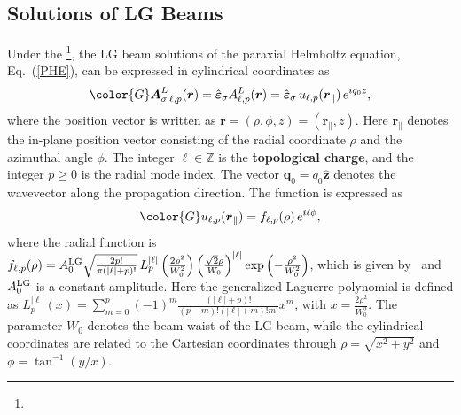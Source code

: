 \subsection{Solutions of LG Beams}
Under the \footnote{}, the LG beam solutions of the paraxial Helmholtz equation, Eq.~(\ref{PHE}), can be expressed in cylindrical coordinates as
\begin{equation}
\color{G}
\boldsymbol{A}^{L}_{\sigma, \ell, p}(\boldsymbol{r})
=
\hat{\boldsymbol{\varepsilon}}_\sigma  A^{L}_{\ell, p}(\boldsymbol{r})
=
\hat{\boldsymbol{\varepsilon}}_\sigma 
\, u_{\ell, p}(\boldsymbol{r}_\parallel)
\, e^{i q_0 z},
\label{LGbeam}
\end{equation}
where the position vector is written as $\boldsymbol{r}=(\rho,\phi,z)=(\boldsymbol{r}_\parallel,z)$. Here $\boldsymbol{r}_\parallel$ denotes the in-plane position vector consisting of the radial coordinate $\rho$ and the azimuthal angle $\phi$. The integer $\ell\in\mathbb{Z}$ is the \textbf{topological charge}, and the integer $p\ge0$ is the radial mode index. The vector $\boldsymbol{q}_0 = q_0 \hat{\boldsymbol{z}}$ denotes the wavevector along the propagation direction. The  function is expressed as
\begin{equation}
\color{G}
u_{\ell, p}(\boldsymbol{r}_\parallel)=f_{\ell, p}(\rho)\,e^{i\ell\phi},
\end{equation}
where the radial function is $f_{\ell, p}(\rho)
=
A^{\rm LG}_0\sqrt{\frac{2p!}{\pi(|\ell|+p)!}}
\,
L_p^{|\ell|}
\left(
\frac{2\rho^2}{W_0^2}
\right)
\left(
\frac{\sqrt{2}\rho}{W_0}
\right)^{|\ell|}
\exp\left(
-\frac{\rho^2}{W_0^2}
\right)$, which is given by~\cite{romero2002quantum, peng2022tailoring, sanchez2024enhanced} and $A^{\rm LG}_0$ is a constant amplitude. Here the generalized Laguerre polynomial is defined as $L_p^{|\ell|}(x)
=
\sum_{m=0}^{p}
(-1)^m
\frac{(|\ell|+p)!}{(p-m)!(|\ell|+m)!m!}
x^m$, with $x=\frac{2\rho^2}{W_0^2}$. The parameter $W_0$ denotes the beam waist of the LG beam, while the cylindrical coordinates are related to the Cartesian coordinates through $\rho=\sqrt{x^2+y^2}$ and $\phi=\tan^{-1}(y/x)$. 

